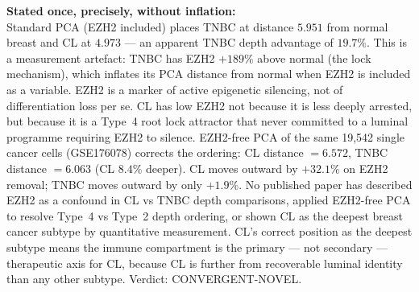 \documentclass[12pt, a4paper]{article}
\begin{document}
\begin{center}
\colorbox{findingbox}{
\begin{minipage}{0.88\textwidth}
\vspace{0.6em}
\textbf{Stated once, precisely, without
inflation:}\\[0.5em]
Standard PCA (EZH2 included) places TNBC at
distance $5.951$ from normal breast and CL at
$4.973$ --- an apparent TNBC depth advantage of
$19.7\%$. This is a measurement artefact: TNBC
has EZH2 $+189\%$ above normal (the lock
mechanism), which inflates its PCA distance from
normal when EZH2 is included as a variable.
EZH2 is a marker of active epigenetic silencing,
not of differentiation loss per se. CL has low
EZH2 not because it is less deeply arrested, but
because it is a Type~4 root lock attractor that
never committed to a luminal programme requiring
EZH2 to silence. EZH2-free PCA of the same
19,542 single cancer cells (GSE176078) corrects
the ordering: CL distance $= 6.572$, TNBC
distance $= 6.063$ (CL $8.4\%$ deeper). CL
moves outward by $+32.1\%$ on EZH2 removal;
TNBC moves outward by only $+1.9\%$. No published
paper has described EZH2 as a confound in CL vs
TNBC depth comparisons, applied EZH2-free PCA to
resolve Type~4 vs Type~2 depth ordering, or shown
CL as the deepest breast cancer subtype by
quantitative measurement. CL's correct position
as the deepest subtype means the immune
compartment is the primary --- not secondary ---
therapeutic axis for CL, because CL is further
from recoverable luminal identity than any other
subtype. Verdict: CONVERGENT-NOVEL.
\vspace{0.5em}
\end{minipage}}
\end{center}
\end{document}
